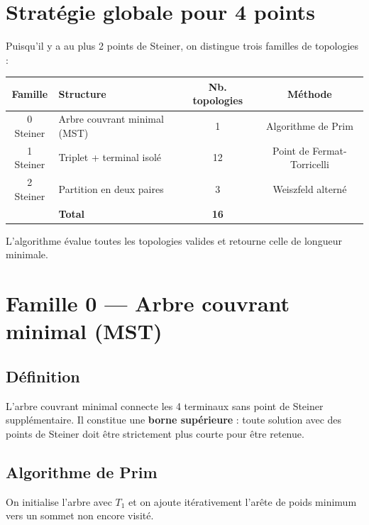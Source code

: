\documentclass[12pt, a4paper]{article}
\begin{document}
\section{Stratégie globale pour 4 points}

Puisqu'il y a au plus 2 points de Steiner, on distingue trois familles de topologies :

\begin{center}
\begin{tabular}{clcc}
\toprule
\textbf{Famille} & \textbf{Structure} & \textbf{Nb. topologies} & \textbf{Méthode} \\
\midrule
0 Steiner & Arbre couvrant minimal (MST) & 1 & Algorithme de Prim \\
1 Steiner & Triplet + terminal isolé & 12 & Point de Fermat-Torricelli \\
2 Steiner & Partition en deux paires & 3 & Weiszfeld alterné \\
\midrule
& \textbf{Total} & \textbf{16} & \\
\bottomrule
\end{tabular}
\end{center}

\medskip

L'algorithme évalue toutes les topologies valides et retourne celle de longueur minimale.

\section{Famille 0 — Arbre couvrant minimal (MST)}

\subsection{Définition}

L'arbre couvrant minimal connecte les 4 terminaux sans point de Steiner supplémentaire.
Il constitue une \textbf{borne supérieure} : toute solution avec des points de Steiner
doit être strictement plus courte pour être retenue.

\subsection{Algorithme de Prim}

On initialise l'arbre avec $T_1$ et on ajoute itérativement l'arête de poids minimum
vers un sommet non encore visité.
\end{document}
